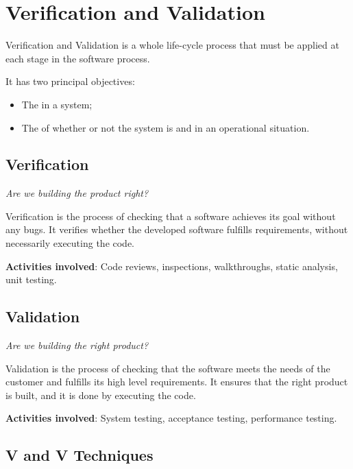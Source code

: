 \chapter{Verification and Validation}

Verification and Validation is a whole life-cycle process that must be applied at each stage in the software process.

It has two principal objectives:
\vspace{-0.5\baselineskip}
\begin{itemize}[parsep=0.25em]
   \item The  in a system;
   \item The  of whether or not the system is  and  in an operational situation.
\end{itemize}


\section{Verification}
 \textit{Are we building the product right?}

Verification is the process of checking that a software achieves its
goal without any bugs. It verifies whether the developed software fulfills requirements, without necessarily executing the code.

\textbf{Activities involved}: Code reviews, inspections, walkthroughs, static analysis, unit testing.

\section{Validation}
 \textit{Are we building the right product?}

Validation is the process of checking that the software meets the needs of the customer and fulfills its high level requirements. It ensures that the right product is built, and it is done by executing the code.

\textbf{Activities involved}: System testing, acceptance testing, performance testing.

\section{V and V Techniques}